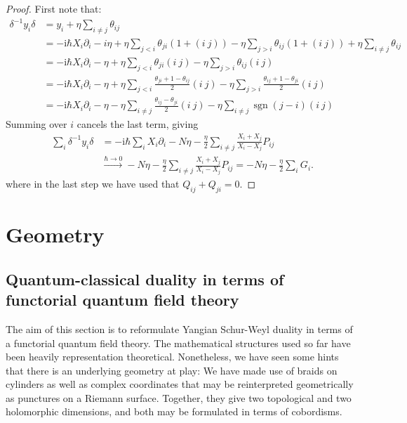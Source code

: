\documentclass[11pt]{report}
\theoremstyle{definition}
\theoremstyle{remark}
\theoremstyle{remark}
\newcommand{\I}{\mathrm{i}}
\begin{document}
\begin{proof}
First note that:
\begin{align*}
\delta^{-1} y_i \delta
&= y_i + \eta \sum_{i \neq j} \theta_{ij} \\
&= -\I \hbar X_i \partial_i - i \eta + \eta \sum_{j < i} \theta_{ji} (1+(i \ j)) - \eta \sum_{j > i} \theta_{ij} (1+(i \ j)) + \eta \sum_{i \neq j} \theta_{ij} \\
&= -\I \hbar X_i \partial_i - \eta + \eta \sum_{j < i} \theta_{ji} (i \ j) - \eta \sum_{j > i} \theta_{ij} (i \ j) \\
&= -\I \hbar X_i \partial_i - \eta + \eta \sum_{j < i} \frac{\theta_{ji}+1-\theta_{ij}}{2} (i \ j) - \eta \sum_{j > i} \frac{\theta_{ij}+1-\theta_{ji}}{2} (i \ j) \\
&= -\I \hbar X_i \partial_i - \eta - \eta \sum_{i \neq j} \frac{\theta_{ij}-\theta_{ji}}{2} (i \ j) - \eta \sum_{i \neq j} \operatorname{sgn}(j-i) (i \ j)
\end{align*}
Summing over $i$ cancels the last term, giving
\begin{align*}
\sum_i \delta^{-1} y_i \delta
&= -\I\hbar \sum_i X_i \partial_i - N\eta - \frac{\eta}{2} \sum_{i \neq j} \frac{X_i+X_j}{X_i-X_j} P_{ij} \\
&\overset{\hbar \to 0}\longrightarrow -N\eta - \frac{\eta}{2} \sum_{i \neq j} \frac{X_i+X_j}{X_i-X_j} P_{ij} = -N\eta -\frac{\eta}{2} \sum_i G_i.
\end{align*}
where in the last step we have used that $Q_{ij} + Q_{ji} = 0$.
\end{proof}

\chapter{Geometry}\label{chapter:geometry}

\section{Quantum-classical duality in terms of functorial quantum field theory}

The aim of this section is to reformulate Yangian Schur-Weyl duality in terms of a functorial quantum field theory. The mathematical structures used so far have been heavily representation theoretical. Nonetheless, we have seen some hints that there is an underlying geometry at play: We have made use of braids on cylinders as well as complex coordinates that may be reinterpreted geometrically as punctures on a Riemann surface. Together, they give two topological and two holomorphic dimensions, and both may be formulated in terms of cobordisms.
\end{document}
